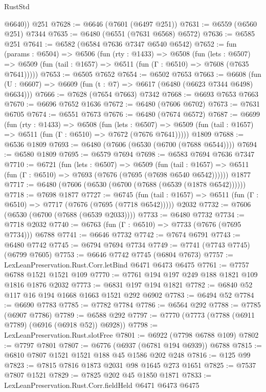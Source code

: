 \begin{lexlean}{RustStd}
\begin{coremodule}
        @6640))
    @251
@7628 := @6646 (@7601 (@6497 @251))
@7631 := @6559 (@6560 @251) @7344
@7635 := @6480 (@6551 (@7631 @6568) @6572)
@7636 := @6585 @251
@7641 := @6582 (@6584 @7636 @7347 @6540 @6542)
@7652 := fun (params : @6504) =>
  @6506
    (fun (rty : @1433) =>
    @6508
      (fun (lets : @6507) =>
      @6509 (fun (tail : @1657) => @6511 (fun (Γ : @6510) => @7608 (@7635 @7641)))))
@7653 := @6505 @7652
@7654 := @6502 @7653
@7663 := @6608 (fun (U : @6607) => @6609 (fun (t : @7) => @6617 (@6480 (@6623 @7344 @6498) @6634)))
@7666 := @7628 (@7654 @7663) @7342
@7668 := @6693 @7653 @7663
@7670 := @6696 @7652 @1636
@7672 := @6480 (@7606 @6702)
@7673 := @7631 @6705
@7674 := @6551 @7673
@7676 := @6480 (@7674 @6572)
@7687 := @6699
    (fun (rty : @1433) =>
    @6508
      (fun (lets : @6507) =>
      @6509 (fun (tail : @1657) => @6511 (fun (Γ : @6510) => @7672 (@7676 @7641)))))
    @1809
@7688 := @6536 @1809
@7693 := @6480 (@7606 (@6530 (@6700 (@7688 @6544))))
@7694 := @6580 @1809
@7695 := @6579 @7694
@7698 := @6583 @7694 @7636 @7347
@7710 := @6721
    (fun (lets : @6507) =>
    @6509
      (fun (tail : @1657) => @6511 (fun (Γ : @6510) => @7693 (@7676 (@7695 (@7698 @6540 @6542))))))
    @1877
@7717 := @6480 (@7606 (@6530 (@6700 (@7688 (@6539 (@1878 @6542))))))
@7718 := @7698 @1877
@7727 := @6745
    (fun (tail : @1657) => @6511 (fun (Γ : @6510) => @7717 (@7676 (@7695 (@7718 @6542)))))
    @2032
@7732 := @7606 (@6530 (@6700 (@7688 (@6539 @2033))))
@7733 := @6480 @7732
@7734 := @7718 @2032
@7740 := @6763 (fun (Γ : @6510) => @7733 (@7676 (@7695 @7734))) @6788
@7741 := @6646 @7732
@7742 := @7674 @6791
@7743 := @6480 @7742
@7745 := @6794 @7694 @7734
@7749 := @7741 (@7743 @7745) (@6799 @7605)
@7753 := @6646 @7742 @7745 (@6804 @7673)
@7757 := LexLeanPreservation.Rust.Corr.letBind @6471 @6473 @6475
@7761 := @7757 @6788 @1521 @1521 @109
@7770 := @7761 @194 @197 @249 @188 @1821 @109 @1816 @1876 @2032
@7773 := @6831 @197 @194 @1821
@7782 := @6840 @52 @117 @16 @194 @1668 @1663 @1521 @292 @6902
@7783 := @6494 @52
@7784 := @6690 @7783
@7785 := @7782 @7784
@7786 := @6564 @292
@7788 := @7785 (@6907 @7786)
@7789 := @6588 @292
@7797 := @7770 (@7773 (@7788 (@6911 @7789) (@6916 (@6918 @52)) @6928))
@7798 := LexLeanPreservation.Rust.slotFree
@7801 := @6922 (@7798 @6788 @109)
@7802 := @7797 @7801
@7807 := @6776 (@6937 (@6781 @194 @6939)) @6788
@7815 := @6810 @7807 @1521 @1521 @188 @45 @1586 @202 @248
@7816 := @125 @99
@7823 := @7815 @7816 @1873 @2031 @98 @1645 @273 @1651
@7825 := @7537 @7807 @1521
@7829 := @7825 @202 @45 @1850 @1871
@7833 := LexLeanPreservation.Rust.Corr.fieldHeld @6471 @6473 @6475

\end{coremodule}
\end{lexlean}

